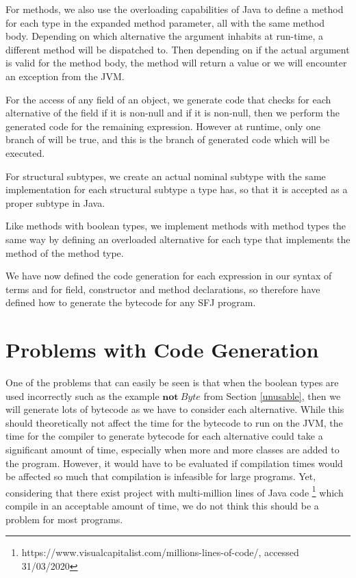 \documentclass{l4proj}
\begin{document}
For methods, we also use the overloading capabilities of Java to define a method for each type in the expanded method parameter, all with the same method body.
Depending on which alternative the argument inhabits at run-time, a different method will be dispatched to.
Then depending on if the actual argument is valid for the method body, the method will return a value or we will encounter an exception from the JVM.

For the access of any field of an object, we generate code that checks for each alternative of the field if it is non-null and if it is non-null, then we perform the generated code for the remaining expression. However at runtime, only one branch of will be true, and this is the branch of generated code which will be executed.

For structural subtypes, we create an actual nominal subtype with the same implementation for each structural subtype a type has, so that it is accepted as a proper subtype in Java.

Like methods with boolean types, we implement methods with method types the same way by defining an overloaded alternative for each type that implements the method of the method type.

We have now defined the code generation for each expression in our syntax of terms and for field, constructor and method declarations, so therefore have defined how to generate the bytecode for any SFJ program.

\section{Problems with Code Generation}

One of the problems that can easily be seen is that when the boolean types are used incorrectly such as the example $\textbf{not}\ Byte$ from Section \ref{unusable}, then we will generate lots of bytecode as we have to consider each alternative.
While this should theoretically not affect the time for the bytecode to run on the JVM, the time for the compiler to generate bytecode for each alternative could take a significant amount of time, especially when more and more classes are added to the program.
However, it would have to be evaluated if compilation times would be affected so much that compilation is infeasible for large programs.
Yet, considering that there exist project with multi-million lines of Java code \footnote{https://www.visualcapitalist.com/millions-lines-of-code/, accessed 31/03/2020} which compile in an acceptable amount of time, we do not think this should be a problem for most programs.
\end{document}
